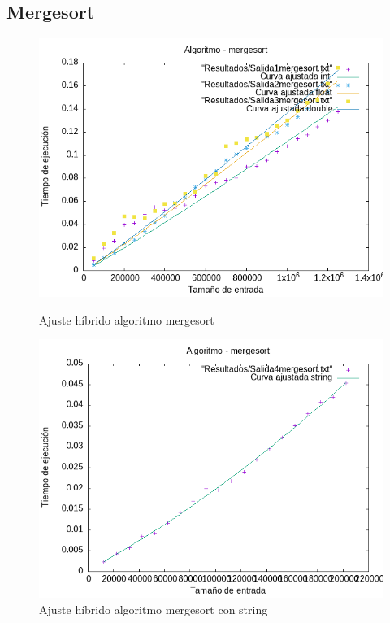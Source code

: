 \documentclass[11pt]{article}
\begin{document}
\subsection*{Mergesort}
\begin{figure}[H]
    \begin{minipage}{0.5\textwidth}
        \centering
        \includegraphics[width=\linewidth]{assets/AjusteHibrido_latex/Hibridomergesort/mergesort_hib.png}
        \caption{Ajuste híbrido algoritmo mergesort}
        \label{fig:mergesort}
    \end{minipage}%
    \begin{minipage}{0.5\textwidth}
        \centering
        \includegraphics[width=\linewidth]{assets/AjusteHibrido_latex/Hibridomergesort/mergesortstring_hib.png}
        \caption{Ajuste híbrido algoritmo mergesort con string}
        \label{fig:mergesort}
    \end{minipage}
\end{figure}
\end{document}
